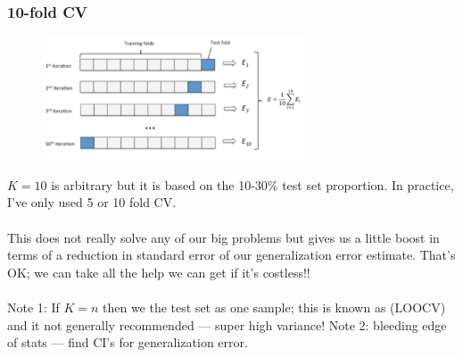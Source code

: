 \documentclass[handout]{beamer}
\begin{document}
\begin{frame}\frametitle{10-fold CV}

\begin{figure}
\centering
\includegraphics[width=3.1in]{10_fold_cv.png}
\end{figure}

\vspace{-0.3cm}
\small
$K=10$ is arbitrary but it is based on the 10-30\% test set proportion. In practice, I've only used 5 or 10 fold CV. \\~\\

\vspace{-0.2cm}
This does not really solve any of our big problems but gives us a little boost in terms of a reduction in standard error of our generalization error estimate. \pause That's OK; we can take all the help we can get if it's costless!! \\~\\

\vspace{-0.2cm}\footnotesize
Note 1: If $K=n$ then we the test set as one sample; this is known as  (LOOCV) and it not generally recommended --- super high variance! Note 2: bleeding edge of stats --- find CI's for generalization error.

	
\end{frame}

\begin{frame}\frametitle{}

	
\end{frame}


\begin{frame}\frametitle{}

	
\end{frame}

\begin{frame}\frametitle{}

	
\end{frame}
\end{document}
